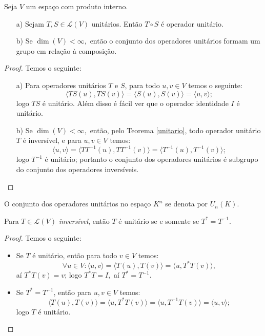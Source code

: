 \documentclass[11pt,twoside,a4paper]{book}
\begin{document}
\begin{proposicao}
Seja $V$ um espaço com produto interno.
\begin{itemize}
\item[a)] Sejam $T,S\in\mathcal{L}(V)$ unitários. Então $T\circ S$ é operador unitário.
\item[b)] Se $\dim(V)<\infty,$ então o conjunto dos operadores unitários formam um grupo em relação à composição.
\end{itemize}
\end{proposicao}
\begin{proof}
Temos o seguinte:
\begin{itemize}
\item[a)] Para operadores unitários $T$ e $S$, para todo $u,v\in V$ temos o seguinte:
\[
\langle TS(u),TS(v)\rangle=\langle S(u),S(v)\rangle=\langle u,v\rangle;
\]
logo $TS$ é unitário. Além disso é fácil ver que o operador identidade $I$ é unitário.
\item[b)] Se $\dim(V)<\infty,$ então, pelo Teorema \ref{unitario}, todo operador unitário $T$ é inversível, e para $u,v\in V$ temos:
\[
\langle u,v\rangle=\langle TT^{-1}(u),TT^{-1}(v)\rangle=\langle T^{-1}(u),T^{-1}(v)\rangle;
\]
logo $T^{-1}$ é unitário; portanto o conjunto dos operadores unitários é subgrupo do conjunto dos operadores inversíveis.
\end{itemize}
\end{proof}

\begin{definicao}
O conjunto dos operadores unitários no espaço $K^n$ se denota por $U_n(K)$.
\end{definicao}

\begin{teorema}
Para $T\in\mathcal{L}(V)$ \emph{inversível}, então $T$ é unitário se e somente se $T^*=T^{-1}$.
\end{teorema}
\begin{proof}
Temos o seguinte:
\begin{itemize}
\item Se $T$ é unitário, então para todo $v\in V$ temos:
\[
\forall u\in V: \langle u,v\rangle=\langle T(u),T(v)\rangle=\langle u,T^*T(v)\rangle,
\]
aí $T^*T(v)=v$; logo $T^*T=I,$ aí $T^*=T^{-1}.$

\item Se $T^*=T^{-1}$, então para $u,v\in V$ temos:
\[
\langle T(u),T(v)\rangle=\langle u,T^*T(v)\rangle=\langle u,T^{-1}T(v)\rangle=\langle u,v\rangle;
\]
logo $T$ é unitário.
\end{itemize}
\end{proof}
\end{document}
